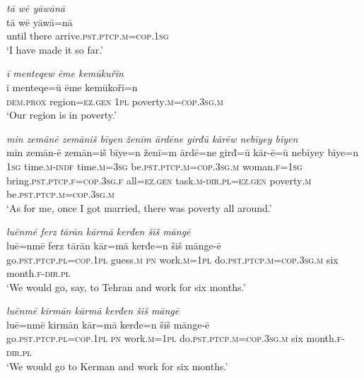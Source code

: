 \ea \label{ŽM.18}
\textit{tā wē yāwānā} \\ 
\gll tā wē yāwā=nā \\ 
 until there arrive\textsc{.pst}\textsc{.ptcp}\textsc{.m}\textsc{=cop}\textsc{.\textsc{1sg}} \\ 
\glt `I have made it so far.'
\z 
 
\ea \label{ŽM.19}
\textit{ī menteqew ēme kemūkuřīn} \\ 
\gll ī menteqe=ū ēme kemūkořī=n \\ 
 \textsc{dem.prox} region\textsc{=ez.gen} \textsc{1pl} poverty\textsc{.m}\textsc{=cop}\textsc{.3sg}\textsc{.m} \\ 
\glt `Our region is in poverty.'
\z 
 
\ea \label{ŽM.20}
\textit{min zemānē zemāniš bīyen ženīm ārdēne girđū kārēw nebīyey bīyen} \\ 
\gll min zemān-ē zemān=iš bīye=n ženī=m ārdē=ne girđ=ū kār-ē=ū nebīyey bīye=n \\ 
 \textsc{1sg} time\textsc{.m}\textsc{-indf} time\textsc{.m}\textsc{=3sg} be\textsc{.pst}\textsc{.ptcp}\textsc{.m}\textsc{=cop}\textsc{.3sg}\textsc{.m} woman\textsc{.f}\textsc{=\textsc{1sg}} bring\textsc{.pst}\textsc{.ptcp}\textsc{.f}\textsc{=cop}\textsc{.3sg}\textsc{.f} all\textsc{=ez.gen} task\textsc{.m}\textsc{-dir}\textsc{.pl}\textsc{=ez.gen} poverty\textsc{.m} be\textsc{.pst}\textsc{.ptcp}\textsc{.m}\textsc{=cop}\textsc{.3sg}\textsc{.m} \\ 
\glt `As for me, once I got married, there was poverty all around.'
\z 
 
\ea \label{ŽM.23}
\textit{luēnmē ferz tārān kārmā kerđen šiš māngē} \\ 
\gll luē=nmē ferz tārān kār=mā kerđe=n šiš mānge-ē \\ 
 go\textsc{.pst}\textsc{.ptcp}\textsc{.pl}\textsc{=cop}\textsc{.\textsc{1pl}} guess\textsc{.m} \textsc{pn} work\textsc{.m}\textsc{=\textsc{1pl}} do\textsc{.pst}\textsc{.ptcp}\textsc{.m}\textsc{=cop}\textsc{.3sg}\textsc{.m} six month\textsc{.f}\textsc{-dir}\textsc{.pl} \\ 
\glt `We would go, say, to Tehran and work for six months.'
\z 
 
\ea \label{ŽM.24}
\textit{luēnmē kirmān kārmā kerđen šiš māngē} \\ 
\gll luē=nmē kirmān kār=mā kerđe=n šiš mānge-ē \\ 
 go\textsc{.pst}\textsc{.ptcp}\textsc{.pl}\textsc{=cop}\textsc{.\textsc{1pl}} \textsc{pn} work\textsc{.m}\textsc{=\textsc{1pl}} do\textsc{.pst}\textsc{.ptcp}\textsc{.m}\textsc{=cop}\textsc{.3sg}\textsc{.m} six month\textsc{.f}\textsc{-dir}\textsc{.pl} \\ 
\glt `We would go to Kerman and work for six months.'
\z 
 
